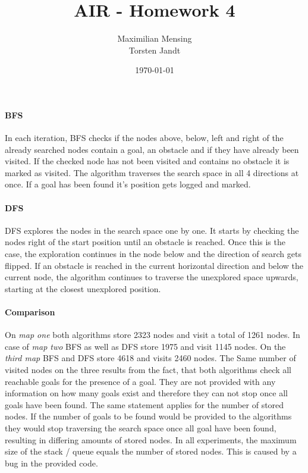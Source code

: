 \documentclass[a4paper,headsepline,12pt]{scrartcl}
\title{AIR - Homework 4}
\date{\today}
\author{Maximilian Mensing\\Torsten Jandt}
\begin{document}
\maketitle{}
\paragraph{BFS}
In each iteration, BFS checks if the nodes above, below, left and right of the already searched nodes contain a goal, an obstacle and if they have already been visited.
If the checked node has not been visited and contains no obstacle it is marked as visited.
The algorithm traverses the search space in all 4 directions at once.
If a goal has been found it's position gets logged and marked.

\paragraph{DFS} DFS explores the nodes in the search space one by one.
It starts by checking the nodes right of the start position until an obstacle is reached.
Once this is the case, the exploration continues in the node below and the direction of search gets flipped.
If an obstacle is reached in the current horizontal direction and below the current node, the algorithm continues to traverse the unexplored space upwards, starting at the closest unexplored position.

\paragraph{Comparison}
On \emph{map one} both algorithms store 2323 nodes and visit a total of 1261 nodes.
In case of \emph{map two} BFS as well as DFS store 1975 and visit 1145 nodes.
On the \emph{third map} BFS and DFS store 4618 and visits 2460 nodes.
The Same number of visited nodes on the three results from the fact, that both algorithms check all reachable goals for the presence of a goal.
They are not provided with any information on how many goals exist and therefore they can not stop once all goals have been found. 
The same statement applies for the number of stored nodes.
If the number of goals to be found would be provided to the algorithms they would stop traversing the search space once all goal have been found, resulting in differing amounts of stored nodes.
In all experiments, the maximum size of the stack / queue equals the number of stored nodes.
This is caused by a bug in the provided code.
\end{document}
